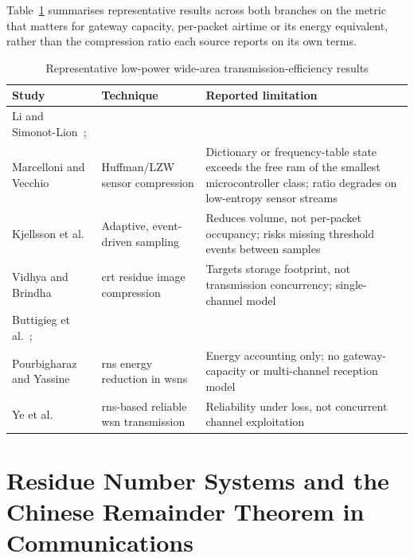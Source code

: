 \documentclass[12pt,a4paper,oneside]{book}
\begin{document}
Table~\ref{tab:lit-lpwan-comparison} summarises representative results
across both branches on the metric that matters for gateway capacity,
per-packet airtime or its energy equivalent, rather than the compression
ratio each source reports on its own terms.

\begin{table}[htbp]
\centering
\caption{Representative low-power wide-area transmission-efficiency results}
\label{tab:lit-lpwan-comparison}
\footnotesize
\begin{tabularx}{\textwidth}{@{}p{}p{}X@{}}
\toprule
\textbf{Study} & \textbf{Technique} & \textbf{Reported limitation} \\
\midrule
Li and Simonot-Lion~\cite{li2018lossless};\\ Marcelloni and Vecchio~\cite{marcelloni2009energy}
  & Huffman/LZW sensor compression
  & Dictionary or frequency-table state exceeds the free \gls{ram} of the
    smallest microcontroller class; ratio degrades on low-entropy sensor
    streams \\
\midrule
Kjellsson et al.~\cite{kjellsson2008adaptive}
  & Adaptive, event-driven sampling
  & Reduces volume, not per-packet occupancy; risks missing threshold
    events between samples \\
\midrule
Vidhya and Brindha~\cite{vidhya2021crt}
  & \gls{crt} residue image compression
  & Targets storage footprint, not transmission concurrency; single-channel
    model \\
\midrule
Buttigieg et al.~\cite{khan2023fuzzycrt};\\ Pourbigharaz and Yassine~\cite{rahman2022rnsenergy}
  & \gls{rns} energy reduction in \glspl{wsn}
  & Energy accounting only; no gateway-capacity or multi-channel reception
    model \\
\midrule
Ye et al.~\cite{djeddi2025parallelCRT}
  & \gls{rns}-based reliable \gls{wsn} transmission
  & Reliability under loss, not concurrent channel exploitation \\
\bottomrule
\end{tabularx}
\end{table}

\section{Residue Number Systems and the Chinese Remainder Theorem in
Communications}
\label{subsec:lit_crt}
\end{document}
